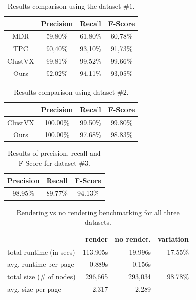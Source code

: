 \documentclass{vldb}
\begin{document}
\begin{table}[h]
\centering
\caption{Results comparison using the dataset $\#1$.}
\label{table:compare1}
\begin{tabular}
{|c| c| c| c|}\hline
	& Precision	& Recall	& F-Score\\ \hline
MDR\cite{MDR03} &	59,80\%	& 61,80\%	& 60,78\%\\ \hline
TPC\cite{TPC09}	& 90,40\%	& 93,10\%	& 91,73\%\\ \hline
ClustVX\cite{grigalis2013towards} &	99.81\% & 99.52\% & 99.66\%\\ \hline
Ours &	92,02\%	& 94,11\%	& 93,05\% \\ \hline
\end{tabular}
\end{table}

\begin{table}[h]
\centering
\caption{Results comparison using dataset $\#2$.}
\label{table:compare2}
\begin{tabular}
{|c| c| c| c|}\hline
	& Precision	& Recall	& F-Score\\ \hline
ClustVX\cite{grigalis2013towards} &	100.00\% & 99.50\% & 99.80\%\\ \hline
Ours &	100.00\% & 97.68\% & 98.83\% \\ \hline
\end{tabular}
\end{table}

\begin{table}[h]
\centering
\caption{Results of precision, recall and F-Score for dataset $\#3$.}
\label{table:compare3}
\begin{tabular}
{| c| c| c|}\hline
	Precision	& Recall	& F-Score\\ \hline
	98.95\% & 89.77\% & 94.13\% \\ \hline
\end{tabular}
\end{table}

\begin{table}[h]
\centering
\caption{Rendering vs no rendering benchmarking for all three datasets.}
\label{table:compare4}
\begin{tabular}
{|l| r| r| r|}\hline
 & render & no render. & variation \\\hline
total runtime (in secs) & 113.905s & 19.996s & 17.55\% \\\hline
avg. runtime per page & 0.889s & 0.156s & \\\hline
total size (\# of nodes) & 296,665 & 293,034 & 98.78\% \\\hline
avg. size per page & 2,317 & 2,289 & \\\hline
\end{tabular}
\end{table}
\end{document}
